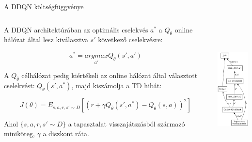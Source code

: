 \documentclass[english, aspectratio=169]{beamer}
\begin{document}
\begin{frame}{A DDQN költségfüggvénye}
\begin{columns}
\begin{column}{.7\textwidth}
A DDQN architektúrában az optimális cselekvés $a^*$ a $Q_\theta$ online hálózat által lesz kiválasztva $s'$ következő cselekvésre:
\begin{block}{}
\[
a^*=\underset{a'}{argmax}Q_\theta(s',a')
\]
\end{block}
A $Q_{\bar{\theta}}$ célhálózat pedig kiértékeli az online hálózat által választott cselekvést: $Q_{\bar{\theta}}(s',a^*)$, majd kiszámolja a TD hibát: 
\begin{block}{}
\[
J(\theta) = E_{s,a,r,s' \sim D} \left[ \left( r + \gamma Q_{\bar{\theta}}(s',a^*) - Q_\theta(s,a) \right)^2 \right]
\]
\end{block}
Ahol $\{s,a,r,s' \sim D\}$ a tapasztalat visszajátszásból származó miniköteg, $\gamma$ a diszkont ráta. 
\end{column}
\begin{column}{.3\textwidth}
\begin{center}
\includegraphics[height=7cm, keepaspectratio]{graphs/dql_3.png}
\end{center}
\end{column}
\end{columns}
\end{frame}
\end{document}
